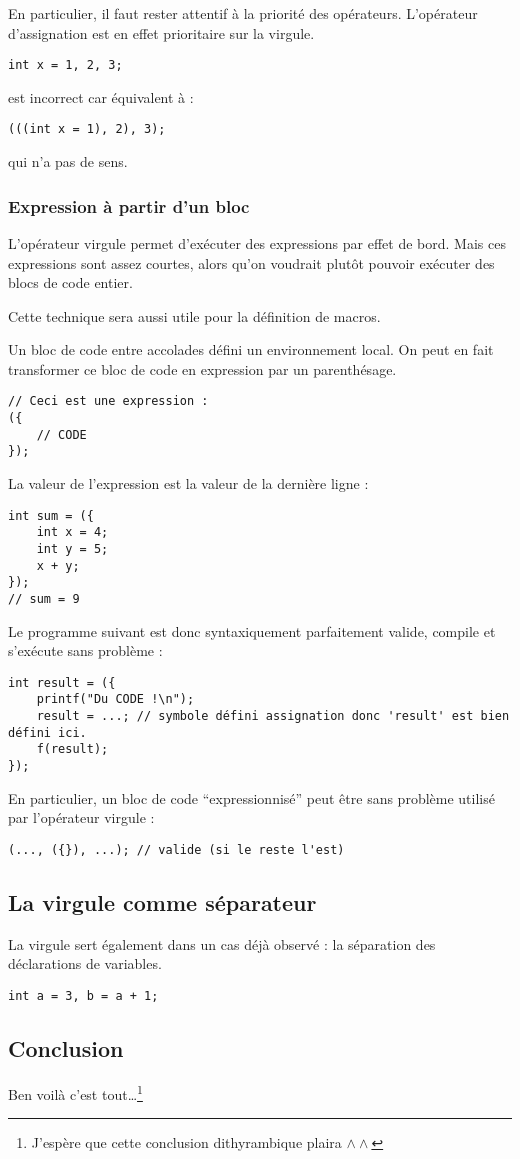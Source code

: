 \documentclass[../../../main.tex]{subfiles}
\begin{document}
En particulier, il faut rester attentif à la priorité des opérateurs. L’opérateur d’assignation est en effet
prioritaire sur la virgule.
\begin{verbatim}
int x = 1, 2, 3;
\end{verbatim}
est incorrect car équivalent à :
\begin{verbatim}
(((int x = 1), 2), 3);
\end{verbatim}
qui n’a pas de sens.
\subsubsection{Expression à partir d'un bloc}
L'opérateur virgule permet d'exécuter des expressions par effet de bord. Mais ces expressions sont assez courtes, alors qu'on voudrait plutôt pouvoir exécuter des blocs de code entier.

Cette technique sera aussi utile pour la définition de macros.

Un bloc de code entre accolades défini un environnement local. On peut en fait transformer ce bloc de code en expression par un parenthésage.
\begin{verbatim}
// Ceci est une expression :
({
	// CODE
});
\end{verbatim}
La valeur de l'expression est la valeur de la dernière ligne :
\begin{verbatim}
int sum = ({
	int x = 4;
	int y = 5;
	x + y;
});
// sum = 9
\end{verbatim}
Le programme suivant est donc syntaxiquement parfaitement valide, compile et s'exécute sans problème :
\begin{verbatim}
int result = ({
	printf("Du CODE !\n");
	result = ...; // symbole défini assignation donc 'result' est bien défini ici.
	f(result);
});
\end{verbatim}
En particulier, un bloc de code ``expressionnisé'' peut être sans problème utilisé par l'opérateur virgule :
\begin{verbatim}
(..., ({}), ...); // valide (si le reste l'est)
\end{verbatim}
\subsection{La virgule comme séparateur}
\label{sub:la_virgule_comme_s_parateur}
La virgule sert également dans un cas déjà observé : la séparation des déclarations de variables.
\begin{verbatim}
int a = 3, b = a + 1;
\end{verbatim}
\subsection{Conclusion}
\label{sub:conclusion}
Ben voilà c’est tout\dots\footnote{J'espère que cette conclusion dithyrambique plaira $\wedge\wedge$}
\end{document}
